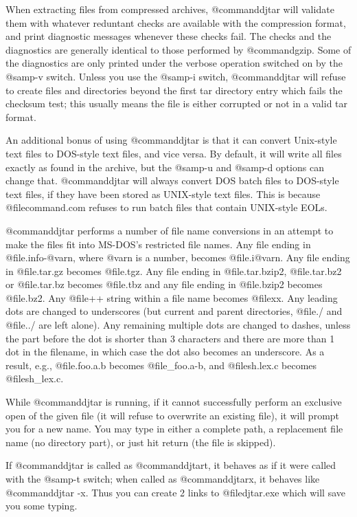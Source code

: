When extracting files from compressed archives, @command{djtar} will
validate them with whatever reduntant checks are available with the
compression format, and print diagnostic messages whenever these checks
fail.  The checks and the diagnostics are generally identical to those
performed by @command{gzip}.  Some of the diagnostics are only printed under
the verbose operation switched on by the @samp{-v} switch.  Unless you use
the @samp{-i} switch, @command{djtar} will refuse to create files and
directories beyond the first tar directory entry which fails the checksum
test; this usually means the file is either corrupted or not in a valid
tar format.

An additional bonus of using @command{djtar} is that it can convert
Unix-style text files to DOS-style text files, and vice versa.  By
default, it will write all files exactly as found in the archive, but the
@samp{-u} and @samp{-d} options can change that.  @command{djtar} will
always convert DOS batch files to DOS-style text files, if they
have been stored as UNIX-style text files.  This is because
@file{command.com} refuses to run batch files that contain
UNIX-style EOLs.

@command{djtar} performs a number of file name conversions in an attempt
to make the files fit into MS-DOS's restricted file names.  Any file
ending in @file{.info-@var{n}}, where @var{n} is a number, becomes
@file{.i@var{n}}.  Any file ending in @file{.tar.gz} becomes
@file{.tgz}.  Any file ending in @file{.tar.bzip2}, @file{.tar.bz2}
or @file{.tar.bz} becomes @file{.tbz} and any file ending in
@file{.bzip2} becomes @file{.bz2}.  Any @file{++} string within
a file name becomes @file{xx}.
Any leading dots are changed to underscores (but current and parent
directories, @file{./} and @file{../} are left alone).  Any remaining
multiple dots are changed to dashes, unless the part before the dot is
shorter than 3 characters and there are more than 1 dot in the filename,
in which case the dot also becomes an underscore.  As a result, e.g.,
@file{.foo.a.b} becomes @file{_foo.a-b}, and @file{sh.lex.c} becomes
@file{sh_lex.c}.

While @command{djtar} is running, if it cannot successfully perform an
exclusive open of the given file (it will refuse to overwrite an
existing file), it will prompt you for a new name.  You may type in
either a complete path, a replacement file name (no directory part), or
just hit return (the file is skipped).

If @command{djtar} is called as @command{djtart}, it behaves as if it were
called with the @samp{-t} switch; when called as @command{djtarx}, it
behaves like @command{djtar -x}.  Thus you can create 2 links to
@file{djtar.exe} which will save you some typing.

